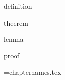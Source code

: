 
\newif\ifInBook \InBooktrue
\let\textbookref\ref

\newcommand\slidenewline{}\let\slidebreak\slidenewline


\newenvironment
    {remark}
    {\textbf{Remark}~\slshape\ignorespaces}{}
\expandafter\ifx\csname definition\endcsname\relax
    \newtheorem{definition}{Definition}
\fi
\expandafter\ifx\csname theorem\endcsname\relax
    \newtheorem{theorem}{Theorem}
\fi
\expandafter\ifx\csname lemma\endcsname\relax
    \newtheorem{lemma}{Lemma}
\fi
\expandafter\ifx\csname proof\endcsname\relax
 \newenvironment{proof}{\begin{quotation}\small\sl\noindent Proof.\ \ignorespaces}
     {\end{quotation}}
\fi


\newwrite\nx
\newwrite\chapterlist
\newif\ifListSources \ListSourcesfalse
\openout\chapterlist=chapternames.tex
\newcommand\CHAPTER[2]{
  \Level 0 {#1}\label{ch:#2}
  \def\chapshortname{#2}

  \addchaptersource{header}%

  \SetBaseLevel 1 
  \SetBaseLevel 0 

  \ifListSources\listchaptersources\chapshortname\fi

  \write\chapterlist{\chapshortname}
  \openout\nx=exercises/\chapshortname-nx.tex
  \write\nx{\arabic{excounter}}
  \closeout\nx

  \SetBaseLevel 0
}
\newcommand\TUTORIAL[2]{
  \Level 0 {#1}\label{tut:#2}
  \def\chapshortname{#2}

  \addchaptersource{header}%

  \SetBaseLevel 1  \TutorialsSubDir/#2
  \SetBaseLevel 0 

  \ifListSources\listchaptersources\chapshortname\fi

  \write\chapterlist{\chapshortname}
  \openout\nx=exercises/\chapshortname-nx.tex
  \write\nx{\arabic{excounter}}
  \closeout\nx

  \SetBaseLevel 0
}

